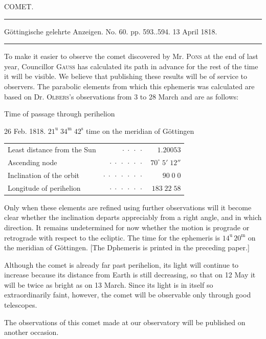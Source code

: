 \clearpage{}\hypertarget{native-408-part-lower}{}\label{native-408-part-lower}
\begin{center}\large COMET.\end{center}
\begin{center}\hrule\vspace{4pt}\fontsize{10}{12}\selectfont Göttingische gelehrte Anzeigen. No. 60. pp. 593..594. 13 April 1818.\par\vspace{4pt}\hrule\vspace{4pt}\end{center}
\par\indent To make it easier to observe the comet discovered by Mr. \textsc{Pons} at the end of last year, Councillor \textsc{Gauss} has calculated its path in advance for the rest of the time it will be visible. We believe that publishing these results will be of service to observers. The parabolic elements from which this ephemeris was calculated are based on Dr. \textsc{Olbers}’s observations from 3 to 28 March and are as follows:

\begin{center}\fontsize{10}{12}\selectfont
Time of passage through perihelion
\par 26 Feb. 1818. $21^{\mathrm u}\;34^{\mathrm m}\;42^{\mathrm s}$ time on the meridian of Göttingen
\par\smallskip\begin{tabular}{lrr}
Least distance from the Sun & $\cdot\;\cdot\;\cdot\;\cdot$ & $1.20053$\\
Ascending node & $\cdot\;\cdot\;\cdot\;\cdot\;\cdot\;\cdot$ & $70^\circ\;5'\;12''$\\
Inclination of the orbit & $\cdot\;\cdot\;\cdot\;\cdot\;\cdot\;\cdot\;\cdot$ & $90\;0\;0$\\
Longitude of perihelion & $\cdot\;\cdot\;\cdot\;\cdot\;\cdot\;\cdot$ & $183\;22\;58$\\
\end{tabular}\end{center}

\par\indent Only when these elements are refined using further observations will it become clear whether the inclination departs appreciably from a right angle, and in which direction. It remains undetermined for now whether the motion is prograde or retrograde with respect to the ecliptic. The time for the ephemeris is $14^{\mathrm u}\,20^{\mathrm m}$ on the meridian of Göttingen. [The Dphemeris is printed in the preceding paper.]

\par\indent Although the comet is already far past perihelion, its light will continue to increase because its distance from Earth is still decreasing, so that on 12 May it will be twice as bright as on 13 March. Since its light is in itself so extraordinarily faint, however, the comet will be observable only through good telescopes.

\par\indent The observations of this comet made at our observatory will be published on another occasion.
